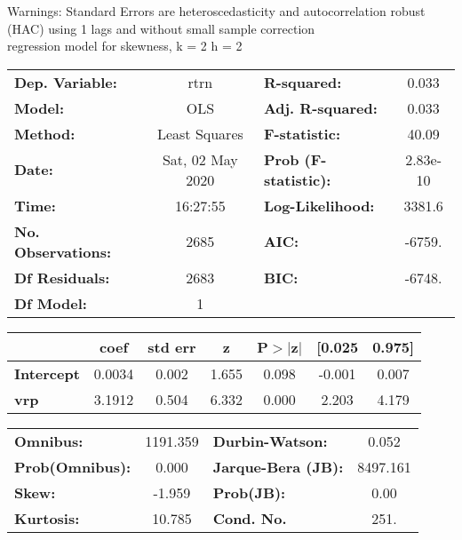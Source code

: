 Warnings: \newline
 [1] Standard Errors are heteroscedasticity and autocorrelation robust (HAC) using 1 lags and without small sample correction\\ 

regression model for skewness, k = 2 h = 2\begin{center}
\begin{tabular}{lclc}
\toprule
\textbf{Dep. Variable:}    &       rtrn       & \textbf{  R-squared:         } &     0.033   \\
\textbf{Model:}            &       OLS        & \textbf{  Adj. R-squared:    } &     0.033   \\
\textbf{Method:}           &  Least Squares   & \textbf{  F-statistic:       } &     40.09   \\
\textbf{Date:}             & Sat, 02 May 2020 & \textbf{  Prob (F-statistic):} &  2.83e-10   \\
\textbf{Time:}             &     16:27:55     & \textbf{  Log-Likelihood:    } &    3381.6   \\
\textbf{No. Observations:} &        2685      & \textbf{  AIC:               } &    -6759.   \\
\textbf{Df Residuals:}     &        2683      & \textbf{  BIC:               } &    -6748.   \\
\textbf{Df Model:}         &           1      & \textbf{                     } &             \\
\bottomrule
\end{tabular}
\begin{tabular}{lcccccc}
                   & \textbf{coef} & \textbf{std err} & \textbf{z} & \textbf{P$> |$z$|$} & \textbf{[0.025} & \textbf{0.975]}  \\
\midrule
\textbf{Intercept} &       0.0034  &        0.002     &     1.655  &         0.098        &       -0.001    &        0.007     \\
\textbf{vrp}       &       3.1912  &        0.504     &     6.332  &         0.000        &        2.203    &        4.179     \\
\bottomrule
\end{tabular}
\begin{tabular}{lclc}
\textbf{Omnibus:}       & 1191.359 & \textbf{  Durbin-Watson:     } &    0.052  \\
\textbf{Prob(Omnibus):} &   0.000  & \textbf{  Jarque-Bera (JB):  } & 8497.161  \\
\textbf{Skew:}          &  -1.959  & \textbf{  Prob(JB):          } &     0.00  \\
\textbf{Kurtosis:}      &  10.785  & \textbf{  Cond. No.          } &     251.  \\
\bottomrule
\end{tabular}
\end{center}

